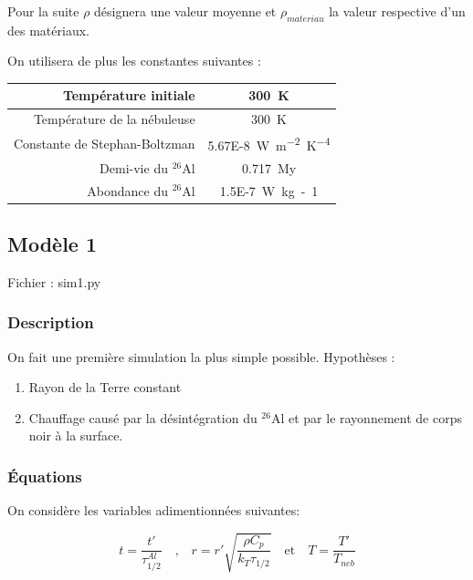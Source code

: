\documentclass[10pt,a4paper]{article}
\numberwithin{equation}{section}
\begin{document}
Pour la suite $\rho$ désignera une valeur moyenne et $\rho_{materiau}$ la valeur respective d'un des matériaux.

On utilisera de plus les constantes suivantes :

\begin{center}
  \begin{tabu}{ r  c }
    \hline
    Température initiale & \SI{300}{K}  \\ \hline
    Température de la nébuleuse & \SI{300}{K}  \\ \hline
    Constante de Stephan-Boltzman & \SI{5.67E-8}{W m^{-2} K^{-4}}  \\ \hline
    Demi-vie du $^{26}$Al & \SI{0.717}{My}  \\ \hline
    Abondance du $^{26}$Al & \SI{1.5E-7}{W kg-1}  \\ \hline
  \end{tabu}
\end{center}

\subsection{Modèle 1}

Fichier : sim1.py

\subsubsection{Description}

On fait une première simulation la plus simple possible.
Hypothèses : 
\begin{enumerate}
\item Rayon de la Terre constant 
\item Chauffage causé par la désintégration du $^{26}$Al et par le rayonnement de corps noir à la surface.
\end{enumerate}



\subsubsection{Équations}

On considère les variables adimentionnées suivantes: 


\begin{equation}
t= \frac{t'}{\tau^{Al}_{1/2}}  \quad \textrm{,} \quad   r = r' \sqrt{\frac{\rho C_p} {k_T \tau_{1/2}}} \quad  \textrm{et} \quad T = \frac{T'}{T_{neb}} 
\end{equation}
\end{document}

